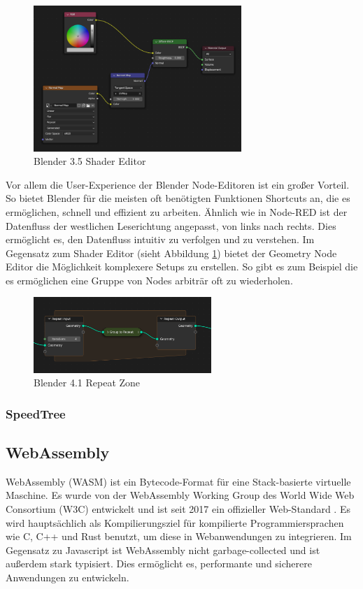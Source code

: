 \documentclass[ngerman]{article}
\begin{document}
\begin{figure}[htbp]
  \centering
  \includegraphics[width=0.7\textwidth]{./graphics/blender-shader.png}
  \caption{Blender 3.5 Shader Editor}
  \label{fig:blender-shader}
\end{figure}

Vor allem die User-Experience der Blender Node-Editoren ist ein großer Vorteil. So bietet Blender für die meisten oft benötigten Funktionen Shortcuts an, die es ermöglichen, schnell und effizient zu arbeiten.
Ähnlich wie in Node-RED ist der Datenfluss der westlichen Leserichtung angepasst, von links nach rechts. Dies ermöglicht es, den Datenfluss intuitiv zu verfolgen und zu verstehen.
\br
Im Gegensatz zum Shader Editor (sieht Abbildung \ref{fig:blender-shader}) bietet der Geometry Node Editor die Möglichkeit komplexere Setups zu erstellen. So gibt es zum Beispiel   die es ermöglichen eine Gruppe von Nodes arbiträr oft zu wiederholen.

\begin{figure}[htbp]
  \centering
  \includegraphics[width=0.6\textwidth]{./graphics/modeling_geometry-nodes_repeat_zone.png}
  \caption{Blender 4.1 Repeat Zone}
  \label{fig:blender-repeat}
\end{figure}

\subsubsection{SpeedTree}

\subsection{WebAssembly}
WebAssembly (WASM) ist ein Bytecode-Format für eine Stack-basierte virtuelle Maschine. Es wurde von der WebAssembly Working Group des World Wide Web Consortium (W3C) entwickelt und ist seit 2017 ein offizieller Web-Standard \cite{Haas2017}. 
\br
Es wird hauptsächlich als Kompilierungsziel für kompilierte Programmiersprachen wie C, C++ und Rust benutzt, um diese in Webanwendungen zu integrieren. Im Gegensatz zu Javascript ist WebAssembly nicht garbage-collected und ist außerdem stark typisiert. Dies ermöglicht es, performante und sicherere Anwendungen zu entwickeln.
\end{document}
